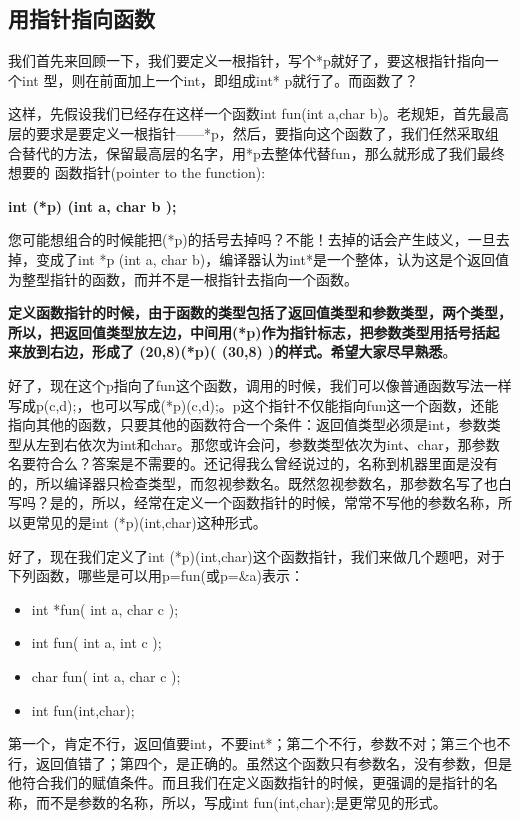 \documentclass[11pt,twoside,a4paper,titlepage]{article}	%
\newcommand{\kw}[1]{\textcolor[rgb]{0.0,0.0,0.63}{ #1}}
\begin{document}
\subsection{用指针指向函数}
我们首先来回顾一下，我们要定义一根指针，写个*p就好了，要这根指针指向一个int 型，则在前面加上一个int，即组成int* p就行了。而函数了？

这样，先假设我们已经存在这样一个函数int fun(int a,char b)。老规矩，首先最高层的要求是要定义一根指针——*p，然后，要指向这个函数了，我们任然采取组合替代的方法，保留最高层的名字，用*p去整体代替fun，那么就形成了我们最终想要的\kw{函数指针(pointer to the function)}:
\begin{center}
\textbf{int (*p) (int a, char b );}
\end{center}

您可能想组合的时候能把(*p)的括号去掉吗？不能！去掉的话会产生歧义，一旦去掉，变成了\textcolor[rgb]{0.7,.0,.0}{int *}p (int a, char b)，编译器认为int*是一个整体，认为这是个返回值为整型指针的函数，而并不是一根指针去指向一个函数。

\textbf{定义函数指针的时候，由于函数的类型包括了返回值类型和参数类型，两个类型，所以，把返回值类型放左边，中间用(*p)作为指针标志，把参数类型用括号括起来放到右边，形成了 \framebox(20,8){}(*p)( \framebox(30,8){} )的样式。希望大家尽早熟悉}。

好了，现在这个p指向了fun这个函数，调用的时候，我们可以像普通函数写法一样写成p(c,d);，也可以写成(*p)(c,d);。p这个指针不仅能指向fun这一个函数，还能指向其他的函数，只要其他的函数符合一个条件：返回值类型必须是int，参数类型从左到右依次为int和char。那您或许会问，参数类型依次为int、char，那参数名要符合么？答案是不需要的。还记得我么曾经说过的，名称到机器里面是没有的，所以编译器只检查类型，而忽视参数名。既然忽视参数名，那参数名写了也白写吗？是的，所以，经常在定义一个函数指针的时候，常常不写他的参数名称，所以更常见的是int (*p)(int,char)这种形式。

好了，现在我们定义了int (*p)(int,char)这个函数指针，我们来做几个题吧，对于下列函数，哪些是可以用p=fun(或p=\&a)表示：
\begin{itemize}
	\item int *fun( int a, char c );
	\item int fun( int a, int c );
	\item char fun( int a, char c );
	\item int fun(int,char);
\end{itemize}

第一个，肯定不行，返回值要int，不要int*；第二个不行，参数不对；第三个也不行，返回值错了；第四个，是正确的。虽然这个函数只有参数名，没有参数，但是他符合我们的赋值条件。而且我们在定义函数指针的时候，更强调的是指针的名称，而不是参数的名称，所以，写成int fun(int,char);是更常见的形式。
\end{document}
